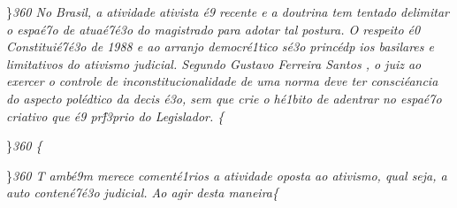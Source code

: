 \par \}\pard \ltrpar\qj {}\sl360\widctlpar\wrapdefault\faauto{} {\rtlch{}  \ltrch{}  No Brasil, a atividade ativista \'e9
 recente e a doutrina tem tentado delimitar o espa\'e7o de atua\'e7\'e3o do magistrado para adotar tal postura. O respeito \'e0 Constitui\'e7\'e3o de 1988 e ao arranjo democr\'e1tico s\'e3o princ\'edp
ios basilares e limitativos do ativismo judicial. Segundo Gustavo Ferreira Santos}{\rtlch{}  \ltrch{} \super{} }{\rtlch{}  \ltrch{}  , o juiz ao exercer o controle de inconstitucionalidade de uma norma deve ter consci\'eancia do aspecto pol\'edtico da decis
\'e3o, sem que crie o h\'e1bito de adentrar no espa\'e7o criativo }{\rtlch{}  \ltrch{}  que \'e9 pr\'f3prio do Legislador. }\{\rtlch{}
 \ltrch{} 
\par \}\pard \ltrpar\qj {}\sl360\widctlpar\wrapdefault\faauto{} \{\rtlch{}
 \ltrch{} 
\par \}\pard \ltrpar\qj {}\sl360\widctlpar\wrapdefault\faauto{} {\rtlch{}  \ltrch{}  \tab }{\rtlch{}  \ltrch{}  T}{\rtlch{}  \ltrch{} 
 amb\'e9m }{\rtlch{}  \ltrch{}  merece coment\'e1rios }{\rtlch{}  \ltrch{}  a atividade oposta}{\rtlch{}  \ltrch{}  
 ao ativismo, qual seja, a auto}{\rtlch{}  \ltrch{}  conten\'e7\'e3o }{\rtlch{}  \ltrch{}  judicial. Ao agir desta maneira}\{\rtlch{}

